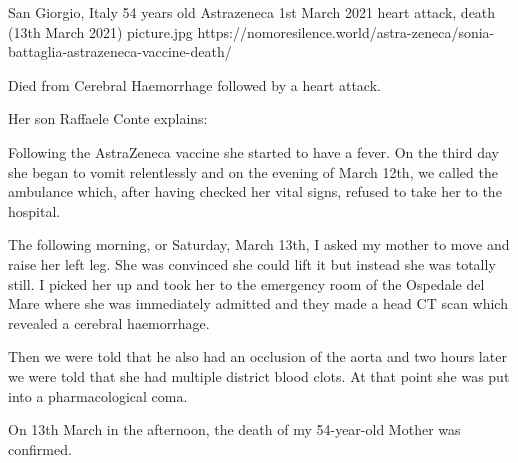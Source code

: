 {San Giorgio, Italy}
{54 years old}
{Astrazeneca}
{1st March 2021}
{heart attack, death (13th March 2021)}
{picture.jpg}
{https://nomoresilence.world/astra-zeneca/sonia-battaglia-astrazeneca-vaccine-death/}
{

Died from Cerebral Haemorrhage followed by a heart attack.

Her son Raffaele Conte explains:

Following the AstraZeneca vaccine she started to have a fever. On the third day
she began to vomit relentlessly and on the evening of March 12th, we called the
ambulance which, after having checked her vital signs, refused to take her to
the hospital.

The following morning, or Saturday, March 13th, I asked my mother to move and
raise her left leg. She was convinced she could lift it but instead she was
totally still. I picked her up and took her to the emergency room of the
Ospedale del Mare where she was immediately admitted and they made a head CT
scan which revealed a cerebral haemorrhage.

Then we were told that he also had an occlusion of the aorta and two hours later
we were told that she had multiple district blood clots. At that point she was
put into a pharmacological coma.

On 13th March in the afternoon, the death of my 54-year-old Mother was
confirmed.

}
